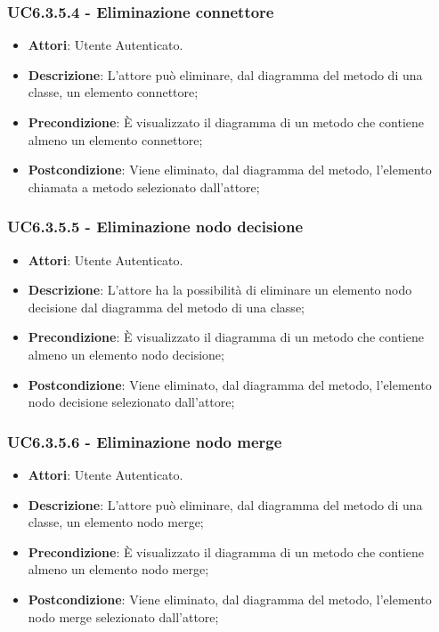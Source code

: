 \subsubsection{UC6.3.5.4 - Eliminazione connettore} 
\label{sssec:UC6.3.5.4} 
\begin{itemize} 
\item \textbf{Attori}: Utente Autenticato.
\item \textbf{Descrizione}: L'attore può eliminare, dal diagramma del metodo di una classe, un elemento connettore;
\item \textbf{Precondizione}: È visualizzato il diagramma di un metodo che contiene almeno un elemento connettore;
\item \textbf{Postcondizione}: Viene eliminato, dal diagramma del metodo,  l'elemento chiamata a metodo selezionato dall'attore;
\end{itemize} 
\subsubsection{UC6.3.5.5 - Eliminazione nodo decisione} 
\label{sssec:UC6.3.5.5} 
\begin{itemize} 
\item \textbf{Attori}: Utente Autenticato.
\item \textbf{Descrizione}: L'attore ha la possibilità di eliminare un elemento nodo decisione dal diagramma del metodo di una classe;
\item \textbf{Precondizione}: È visualizzato il diagramma di un metodo che contiene almeno un elemento nodo decisione;
\item \textbf{Postcondizione}: Viene eliminato, dal diagramma del metodo,  l'elemento nodo decisione selezionato dall'attore;
\end{itemize} 
\subsubsection{UC6.3.5.6 - Eliminazione nodo merge} 
\label{sssec:UC6.3.5.6} 
\begin{itemize} 
\item \textbf{Attori}: Utente Autenticato.
\item \textbf{Descrizione}: L'attore può eliminare, dal diagramma del metodo di una classe, un elemento nodo merge;
\item \textbf{Precondizione}: È visualizzato il diagramma di un metodo che contiene almeno un elemento nodo merge;
\item \textbf{Postcondizione}: Viene eliminato, dal diagramma del metodo,  l'elemento nodo merge selezionato dall'attore;
\end{itemize} 
